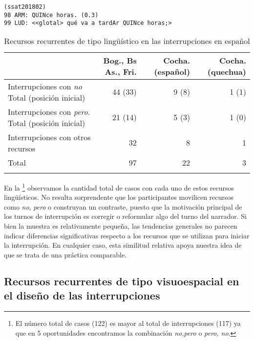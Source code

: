 \documentclass[output=paper]{../langscibook}
\begin{document}
\ea\label{ex:satti:6}
\begin{verbatim}
(ssat201802)
98 ARM: QUINce horas. (0.3)
99 LUD: <<glotal> qué va a tardAr QUINce horas;>
\end{verbatim}
\z

\begin{table}
\caption{\label{tab:satti:2}Recursos recurrentes de tipo lingüístico en las interrupciones en español}

\begin{tabularx}{\textwidth}{Qr@{~}r@{~}r}
\lsptoprule
& {  Bog., Bs As., Fri.} & {  Cocha. (español)} & {  Cocha. (quechua)}\\
\midrule
{  Interrupciones con \textit{no}}
{  Total (posición inicial)} & 44 (33) & 9 (8) & 1 (1)\\
{  Interrupciones con \textit{pero}.}
{  Total (posición inicial)} & 21 (14) & 5 (3) & 1 (0)\\
 Interrupciones con otros recursos & 32 & 8 & 1\\
 \midrule
 Total & 97 & 22 & 3\\
\lspbottomrule
\end{tabularx}
\end{table}

En la \footnote{El número total de casos (122) es mayor al total de interrupciones (117) ya que en 5 oportunidades encontramos la combinación \textit{no,pero} o \textit{pero, no}.} observamos la cantidad total de casos con cada uno de estos recursos lingüísticos. No resulta sorprendente que los participantes movilicen recursos como \textit{no}, \textit{pero} o construyan un contraste, puesto que la motivación principal de los turnos de interrupción es corregir o reformular algo del turno del narrador. Si bien la muestra es relativamente pequeña, las tendencias generales no parecen indicar diferencias significativas respecto a los recursos que se utilizan para iniciar la interrupción. En cualquier caso, esta similitud relativa apoya nuestra idea de que se trata de una práctica comparable.

\subsection{Recursos recurrentes de tipo visuoespacial en el diseño de las interrupciones}\label{sec:satti:3.2}
\end{document}

